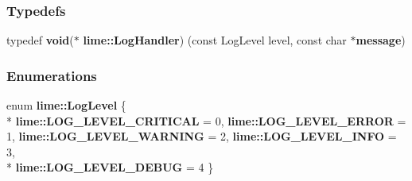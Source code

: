 \subsubsection*{Typedefs}
\begin{DoxyCompactItemize}
\item 
typedef {\bf void}($\ast$ {\bf lime\+::\+Log\+Handler}) (const Log\+Level level, const char $\ast${\bf message})
\end{DoxyCompactItemize}
\subsubsection*{Enumerations}
\begin{DoxyCompactItemize}
\item 
enum {\bf lime\+::\+Log\+Level} \{ \\*
{\bf lime\+::\+L\+O\+G\+\_\+\+L\+E\+V\+E\+L\+\_\+\+C\+R\+I\+T\+I\+C\+AL} = 0, 
{\bf lime\+::\+L\+O\+G\+\_\+\+L\+E\+V\+E\+L\+\_\+\+E\+R\+R\+OR} = 1, 
{\bf lime\+::\+L\+O\+G\+\_\+\+L\+E\+V\+E\+L\+\_\+\+W\+A\+R\+N\+I\+NG} = 2, 
{\bf lime\+::\+L\+O\+G\+\_\+\+L\+E\+V\+E\+L\+\_\+\+I\+N\+FO} = 3, 
\\*
{\bf lime\+::\+L\+O\+G\+\_\+\+L\+E\+V\+E\+L\+\_\+\+D\+E\+B\+UG} = 4
 \}
\end{DoxyCompactItemize}
